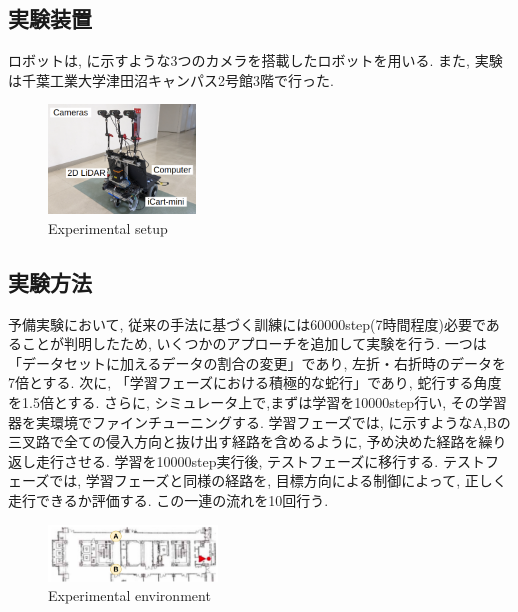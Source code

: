 \documentclass[10pt]{jarticle}
\begin{document}
    \subsection{実験装置}
    ロボットは, に示すような3つのカメラを搭載したロボットを用いる. また, 実験は千葉工業大学津田沼キャンパス2号館3階で行った.
    \begin{center}
        \begin{figure}[h]
            \centering
            \includegraphics[width=0.35\textwidth]{./fig/gamma3.png}
            \caption{Experimental setup}
            \label{fig:gamma}
        \end{figure}
    \end{center}
    \vspace{-1.0cm}

    \subsection{実験方法}
    予備実験において, 従来の手法に基づく訓練には60000step(7時間程度)必要であることが判明したため, いくつかのアプローチを追加して実験を行う. 一つは「データセットに加えるデータの割合の変更」であり, 左折・右折時のデータを7倍とする. 次に, 「学習フェーズにおける積極的な蛇行」であり, 蛇行する角度を1.5倍とする. さらに, 
    シミュレータ上で,まずは学習を10000step行い, その学習器を実環境でファインチューニングする. 学習フェーズでは, に示すようなA,Bの三叉路で全ての侵入方向と抜け出す経路を含めるように, 予め決めた経路を繰り返し走行させる. 学習を10000step実行後, テストフェーズに移行する. テストフェーズでは, 学習フェーズと同様の経路を, 目標方向による制御によって, 正しく走行できるか評価する. この一連の流れを10回行う.
    \begin{center}
        \begin{figure}[h]
            \centering
            \includegraphics[width=0.40\textwidth]{./fig/tsudanuma2.png}
            \caption{Experimental environment}
            \label{fig:tsudanuma}
        \end{figure}
    \end{center}
\end{document}
